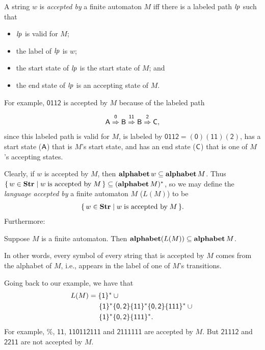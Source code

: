 %
A string $w$ is \emph{accepted by} a finite automaton $M$ iff
there is a labeled path ${\it lp}$ such that
\begin{itemize}
\item ${\it lp}$ is valid for $M$;

\item the label of ${\it lp}$ is $w$;

\item the start state of ${\it lp}$ is the start state of $M$; and

\item the end state of ${\it lp}$ is an accepting state of $M$.
\end{itemize}
For example, $\mathsf{0112}$ is accepted by
$M$ because of the labeled path
\begin{gather*}
\mathsf{A}\stackrel{\strut\mathsf{0}}{\Rightarrow}\mathsf{B}\stackrel{\strut\mathsf{11}}{\Rightarrow}\mathsf{B}\stackrel{\strut\mathsf{2}}{\Rightarrow}\mathsf{C} ,
\end{gather*}
since this labeled path is valid for $M$, is labeled by $\mathsf{0112} =
\mathsf{(0)(11)(2)}$, has a start state ($\mathsf{A}$) that is $M$'s start state,
and has an end state ($\mathsf{C}$) that is one of $M$'s accepting states.

%
%
%
Clearly, if $w$ is accepted by $M$, then
$\mathbf{alphabet}\,w\subseteq\mathbf{alphabet}\,M$.  Thus $\{ \, w\in\mathbf{Str} \mid w\;\allowbreak\mbox{is
    accepted by}\allowbreak\;M \, \}\subseteq(\mathbf{alphabet}\,M)^*$, so we may define the
\emph{language accepted by} a finite automaton $M$ ($L(M)$) to be
\begin{gather*}
\{ \, w\in\mathbf{Str} \mid w\;\allowbreak\mbox{is accepted by}\allowbreak\;M \, \}.
\end{gather*}
Furthermore:

\begin{proposition}
Suppose $M$ is a finite automaton.  Then $\mathbf{alphabet}(L(M))\subseteq\mathbf{alphabet}\,M$.
\end{proposition}

In other words, every symbol of every string that is accepted by $M$
comes from the alphabet of $M$, i.e., appears in the label of one of
$M$'s transitions.

Going back to our example, we have that
\begin{align*}
L(M) &= \{\mathsf{1}\}^* \cup {}\\
     &\quad\;\,\mathsf{\{1\}^*\{0,2\}\{11\}^*\{0,2\}\{111\}^*} \cup {} \\
     &\quad\;\,\mathsf{\{1\}^*\{0,2\}\{111\}^*} .
\end{align*}
For example, $\%$, $\mathsf{11}$, $\mathsf{110112111}$ and
$\mathsf{2111111}$ are accepted by $M$.  But $\mathsf{21112}$ and
$\mathsf{2211}$ are not accepted by $M$.

